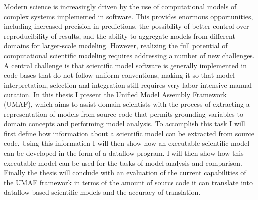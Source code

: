 
\noindent Modern science is increasingly driven by the use of computational models of complex systems implemented in software.
This provides enormous opportunities, including increased precision in predictions, the possibility of better control over reproducibility of results, and the ability to aggregate models from different domains for larger-scale modeling.
However, realizing the full potential of computational scientific modeling requires addressing a number of new challenges.
A central challenge is that scientific model software is generally implemented in code bases that do not follow uniform conventions, making it so that model interpretation, selection and integration still requires very labor-intensive manual curation.
In this thesis I present the Unified Model Assembly Framework (UMAF), which aims to assist domain scientists with the process of extracting a representation of models from source code that permits grounding variables to domain concepts and performing model analysis.
To accomplish this task I will first define how information about a scientific model can be extracted from source code.
Using this information I will then show how an executable scientific model can be developed in the form of a dataflow program.
I will then show how this executable model can be used for the tasks of model analysis and comparison.
Finally the thesis will conclude with an evaluation of the current capabilities of the UMAF framework in terms of the amount of source code it can translate into dataflow-based scientific models and the accuracy of translation.
